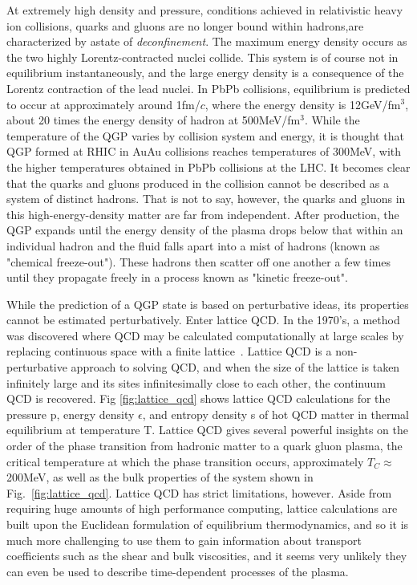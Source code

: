 At extremely high density and pressure, conditions achieved in relativistic heavy ion collisions, quarks and gluons are no longer bound within hadrons,are characterized by astate of \textit{deconfinement}. The maximum energy density occurs as the two highly Lorentz-contracted nuclei collide. This system is of course not in equilibrium instantaneously, and the large energy density is a consequence of the Lorentz contraction of the lead nuclei. In PbPb collisions, equilibrium is predicted to occur at approximately around 1fm/$c$, where the energy density is 12GeV/fm$^3$, about 20 times the energy density of hadron at 500MeV/fm$^3$. While the temperature of the QGP varies by collision system and energy, it is thought that QGP formed at RHIC in AuAu collisions reaches temperatures of 300MeV, with the higher temperatures obtained in PbPb collisions at the LHC. It becomes clear that the quarks and gluons produced in the collision cannot be described as a system of distinct hadrons. That is not to say, however, the quarks and gluons in this high-energy-density matter are far from independent. After production, the QGP expands until the energy density of the plasma drops below that within an individual hadron and the fluid falls apart into a mist of hadrons (known as "chemical freeze-out"). These hadrons then scatter off one another a few times until they propagate freely in a process known as "kinetic freeze-out".

While the prediction of a QGP state is based on perturbative ideas, its properties cannot be estimated perturbatively. Enter lattice QCD. In the 1970's, a method was discovered where QCD may be calculated computationally at large scales by replacing continuous space with a finite lattice~\cite{Wilson1974}. Lattice QCD is a non-perturbative approach to solving QCD, and when the size of the lattice is taken infinitely large and its sites infinitesimally close to each other, the continuum QCD is recovered. Fig \ref{fig:lattice_qcd} shows lattice QCD calculations for the  pressure p, energy density $\epsilon$, and entropy density s of hot QCD matter in thermal equilibrium at temperature T. Lattice QCD gives several powerful insights on the order of the phase transition from hadronic matter to a quark gluon plasma, the critical temperature at which the phase transition occurs, approximately $T_C\approx$200MeV, as well as the bulk properties of the system shown in Fig.~\ref{fig:lattice_qcd}. Lattice QCD has strict limitations, however. Aside from requiring huge amounts of high performance computing, lattice calculations are built upon the Euclidean formulation of equilibrium thermodynamics, and so it is much more challenging to use them to gain information about transport coefficients such as the shear and bulk viscosities, and it seems very unlikely they can even be used to describe time-dependent processes of the plasma.


